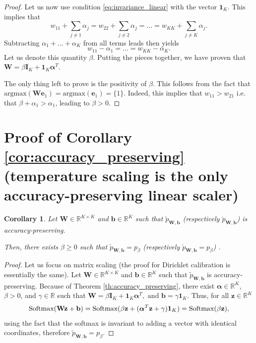 \documentclass[10pt,dvipsnames]{article}
\newcommand{\bz}{\mathbf{z}}%
\newcommand{\bW}{\mathbf{W}}%
\newcommand{\bb}{\mathbf{b}}%
\newcommand{\ba}{\boldsymbol{\alpha}}%
\newcommand{\bI}{\mathbf{I}}%
\newcommand{\bun}{\mathbf{1}}%
\newcommand{\be}{\mathbf{e}}%
\theoremstyle{plain}
\newtheorem{corollary}{Corollary}
\theoremstyle{definition}
\theoremstyle{remark}
\begin{document}
\begin{proof}
Let us now use condition \eqref{eq:invariance_linear} with the vector $\bun_K$. This implies that 
\begin{equation}
    w_{11} + \sum_{j \neq 1} \alpha_j =  w_{22} + \sum_{j \neq 2} \alpha_j = \ldots = w_{KK} + \sum_{j \neq K} \alpha_j.
\end{equation}
Subtracting $\alpha_1 + \ldots + \alpha_K$ from all terms leads then yields
\begin{equation}
    w_{11} - \alpha_1 = \ldots =  w_{KK} - \alpha_K.
\end{equation}
Let us denote this quantity $\beta$. Putting the pieces together, we have proven that $\bW = \beta \bI_K + \bun_K \ba ^T$.

The only thing left to prove is the positivity of $\beta$. This follows from the fact that $\text{argmax}(\bW \be_1) = \text{argmax}(\be_1) = \{1\}$. Indeed, this implies that $w_{11}>w_{21}$ i.e. that $\beta + \alpha_1 > \alpha_1$, leading to $\beta>0$.
\end{proof}

\section{Proof of Corollary \ref{cor:accuracy_preserving} (temperature scaling is the only accuracy-preserving linear scaler)}
\label{app:accuracy_preserving2}
\begin{corollary}
   Let  $\bW \in \mathbb{R}^{K \times K}$ and  $\bb \in \mathbb{R}^K$ such that $\tilde{p}_{\bW,\bb}$ (respectively $\check{p}_{\bW,\bb}$) is accuracy-preserving.
   
   Then, there exists $\beta \geq 0$ such that $\tilde{p}_{\bW,\bb} = p_{\beta}$ (respectively $\check{p}_{\bW,\bb} = p_{\beta}$) .

\end{corollary}
\begin{proof}
    Let us focus on matrix scaling (the proof for Dirichlet calibration is essentially the same). Let  $\bW \in \mathbb{R}^{K \times K}$ and  $\bb \in \mathbb{R}^K$ such that $\tilde{p}_{\bW,\bb}$ is accuracy-preserving. Because of Theorem \ref{th:accuracy_preserving}, there exist $\ba \in \mathbb{R}^K$, $\beta> 0$, and $\gamma \in \mathbb{R}$ such that
$
    \bW = \beta \bI_K + \bun_K \ba ^T, \text{ and } \bb = \gamma \bun_K
$. Thus, for all $\bz \in \mathbb{R}^K$
\begin{equation}
    \textup{Softmax} (\bW \bz+\bb) = \textup{Softmax} ( \beta \bz + (\ba^T \bz + \gamma)\bun_K) = \textup{Softmax} ( \beta \bz),
\end{equation}
using the fact that the softmax is invariant to adding a vector with identical coordinates, therefore $\tilde{p}_{\bW,\bb} = p_{\beta}$.
\end{proof}
\end{document}
